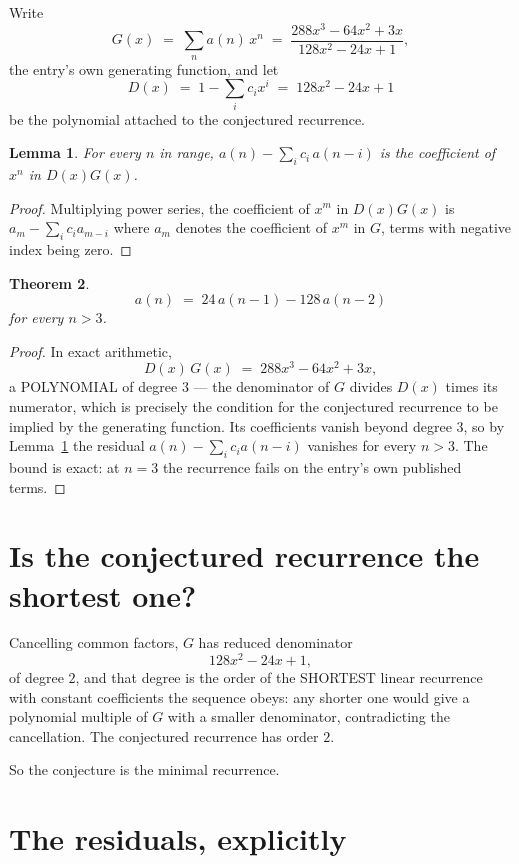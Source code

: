 \documentclass[11pt,a4paper]{article}
\theoremstyle{plain}
\newtheorem{theorem}{Theorem}
\newtheorem{lemma}[theorem]{Lemma}
\theoremstyle{definition}
\begin{document}
Write
\[
G(x)\;=\;\sum_{n}a(n)\,x^{n}\;=\;\frac{288 x^{3} - 64 x^{2} + 3 x}{128 x^{2} - 24 x + 1},
\]
the entry's own generating function, and let
\[
D(x)\;=\;1-\sum_i c_i x^{i}\;=\;128 x^{2} - 24 x + 1
\]
be the polynomial attached to the conjectured recurrence.

\begin{lemma}\label{lem:key}
For every $n$ in range, $a(n)-\sum_i c_i\,a(n-i)$ is the coefficient of $x^{n}$ in
$D(x)G(x)$.
\end{lemma}

\begin{proof}
Multiplying power series, the coefficient of $x^{m}$ in $D(x)G(x)$ is
$a_m-\sum_i c_i a_{m-i}$ where $a_m$ denotes the coefficient of $x^{m}$ in $G$, terms with
negative index being zero.
\end{proof}

\begin{theorem}
\[
a(n)\;=\;24\,a(n-1) - 128\,a(n-2)
\]
for every $n>3$.
\end{theorem}

\begin{proof}
In exact arithmetic,
\[
D(x)\,G(x)\;=\;288 x^{3} - 64 x^{2} + 3 x,
\]
a POLYNOMIAL of degree $3$ --- the denominator of $G$ divides $D(x)$ times its numerator,
which is precisely the condition for the conjectured recurrence to be implied by the
generating function. Its coefficients vanish beyond degree $3$, so by
Lemma~\ref{lem:key} the residual $a(n)-\sum_ic_ia(n-i)$ vanishes for every
$n>3$. The bound is exact: at $n=3$ the recurrence fails on the entry's own published terms.
\end{proof}

\section{Is the conjectured recurrence the shortest one?}

Cancelling common factors, $G$ has reduced denominator
\[
128 x^{2} - 24 x + 1,
\]
of degree $2$, and that degree is the order of the SHORTEST linear recurrence with
constant coefficients the sequence obeys: any shorter one would give a polynomial multiple of
$G$ with a smaller denominator, contradicting the cancellation. The conjectured recurrence has
order $2$.

So the conjecture is the minimal recurrence.

\section{The residuals, explicitly}
\end{document}
